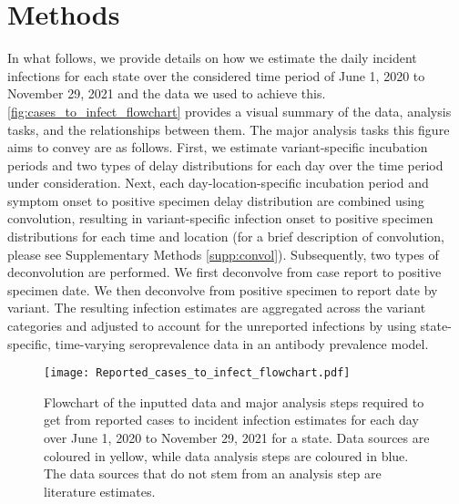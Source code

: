 \section{Methods}
\label{sec:methods}


In what follows, we provide details on how we estimate the daily incident
infections for each state over the considered time period of June 1, 2020 to
November 29, 2021 and the data we used to achieve this.
\autoref{fig:cases_to_infect_flowchart} provides a visual summary of the data,
analysis tasks, and the relationships between them. The major analysis tasks
this figure aims to convey are as follows. First, we estimate variant-specific
incubation periods and two types of delay distributions for each day over the
time period under consideration. Next, each day-location-specific incubation
period and symptom onset to positive specimen delay distribution are combined
using convolution, resulting in variant-specific infection onset to positive
specimen distributions for each time and location (for a brief description of
convolution, please see Supplementary Methods \autoref{supp:convol}). Subsequently, two types of
deconvolution are performed. We first deconvolve from case report to positive
specimen date. We then deconvolve from positive specimen to report date by
variant. The resulting infection estimates are aggregated across the variant
categories and adjusted to account for the unreported infections by using
state-specific, time-varying seroprevalence data in an antibody prevalence
model. 


\begin{figure}[!tb]
\centering
    \texttt{[image: Reported\_cases\_to\_infect\_flowchart.pdf]} 
    \caption{Flowchart of the inputted data and major analysis steps required to
    get from reported cases to incident infection estimates for each day over
    June 1, 2020 to November 29, 2021 for a state. Data sources are coloured in
    yellow, while data analysis steps are coloured in blue. The data sources
    that do not stem from an analysis step are literature estimates.}
    \label{fig:cases_to_infect_flowchart}
\end{figure}









